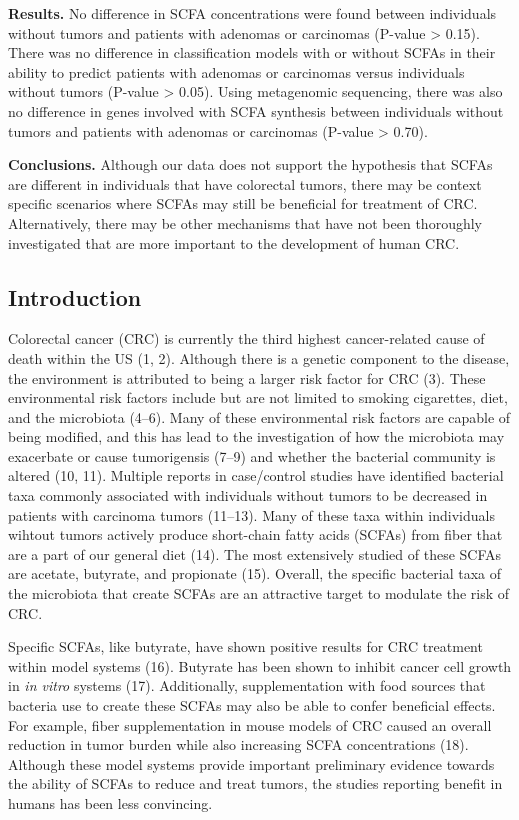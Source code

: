 \documentclass[11pt,]{article}
\begin{document}
\textbf{Results.} No difference in SCFA concentrations were found
between individuals without tumors and patients with adenomas or
carcinomas (P-value \textgreater{} 0.15). There was no difference in
classification models with or without SCFAs in their ability to predict
patients with adenomas or carcinomas versus individuals without tumors
(P-value \textgreater{} 0.05). Using metagenomic sequencing, there was
also no difference in genes involved with SCFA synthesis between
individuals without tumors and patients with adenomas or carcinomas
(P-value \textgreater{} 0.70).

\textbf{Conclusions.} Although our data does not support the hypothesis
that SCFAs are different in individuals that have colorectal tumors,
there may be context specific scenarios where SCFAs may still be
beneficial for treatment of CRC. Alternatively, there may be other
mechanisms that have not been thoroughly investigated that are more
important to the development of human CRC.

\newpage

\subsection{Introduction}\label{introduction}

Colorectal cancer (CRC) is currently the third highest cancer-related
cause of death within the US (1, 2). Although there is a genetic
component to the disease, the environment is attributed to being a
larger risk factor for CRC (3). These environmental risk factors include
but are not limited to smoking cigarettes, diet, and the microbiota
(4--6). Many of these environmental risk factors are capable of being
modified, and this has lead to the investigation of how the microbiota
may exacerbate or cause tumorigensis (7--9) and whether the bacterial
community is altered (10, 11). Multiple reports in case/control studies
have identified bacterial taxa commonly associated with individuals
without tumors to be decreased in patients with carcinoma tumors
(11--13). Many of these taxa within individuals wihtout tumors actively
produce short-chain fatty acids (SCFAs) from fiber that are a part of
our general diet (14). The most extensively studied of these SCFAs are
acetate, butyrate, and propionate (15). Overall, the specific bacterial
taxa of the microbiota that create SCFAs are an attractive target to
modulate the risk of CRC.

Specific SCFAs, like butyrate, have shown positive results for CRC
treatment within model systems (16). Butyrate has been shown to inhibit
cancer cell growth in \emph{in vitro} systems (17). Additionally,
supplementation with food sources that bacteria use to create these
SCFAs may also be able to confer beneficial effects. For example, fiber
supplementation in mouse models of CRC caused an overall reduction in
tumor burden while also increasing SCFA concentrations (18). Although
these model systems provide important preliminary evidence towards the
ability of SCFAs to reduce and treat tumors, the studies reporting
benefit in humans has been less convincing.
\end{document}

